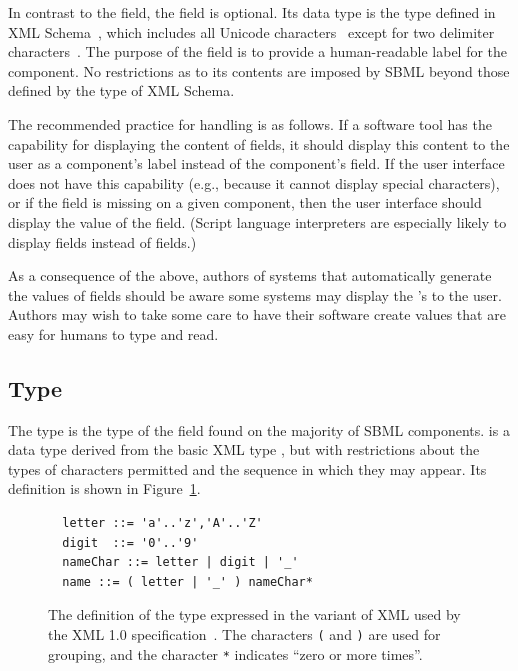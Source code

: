 \documentclass[10pt,twocolumntoc]{cekarticle}
\newcommand{\vref}[1]{\ref{#1}}
\begin{document}
In contrast to the  field, the  field is optional.
Its data type is the type  defined in XML
Schema~\citep{biron:2000,thompson:2000}, which includes all Unicode
characters~\citep{unicode:1996} except for two delimiter
characters~\citep{biron:2000}.  The purpose of the  field is
to provide a human-readable label for the component.  No restrictions as to
its contents are imposed by SBML beyond those defined by the 
type of XML Schema.

The recommended practice for handling  is as follows.  If a
software tool has the capability for displaying the content of
 fields, it should display this content to the user as a
component's label instead of the component's  field.  If the
user interface does not have this capability (e.g., because it cannot
display special characters), or if the  field is missing on a
given component, then the user interface should display the value of the
 field.  (Script language interpreters are especially likely to
display  fields instead of  fields.)

As a consequence of the above, authors of systems that automatically
generate the values of  fields should be aware some systems may
display the 's to the user.  Authors may wish to take some care
to have their software create  values that are easy for humans
to type and read.

\subsection{Type }
\label{sec:id}

The type  is the type of the  field found on the
majority of SBML components.   is a data type derived from the
basic XML type , but with restrictions about the types of
characters permitted and the sequence in which they may appear.  Its
definition is shown in Figure~\vref{fig:id}.

\begin{figure}[h]
  \vspace*{5pt}
  \centering
  \begin{minipage}{3.8in}
\begin{verbatim}
  letter ::= 'a'..'z','A'..'Z'
  digit  ::= '0'..'9'
  nameChar ::= letter | digit | '_'
  name ::= ( letter | '_' ) nameChar*
\end{verbatim}
  \end{minipage}
  \caption{The definition of the type  expressed in the variant
    of XML used by the XML 1.0 specification~\protect\citep{bray:2000}.
    The characters \texttt{(} and \texttt{)} are used for grouping, and the
    character \texttt{*} indicates ``zero or more times''.}
  \label{fig:id}
\end{figure}
\end{document}
